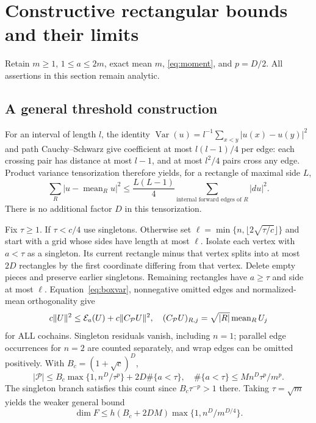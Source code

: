 \section{Constructive rectangular bounds and their limits}\label{sec:spatial-new}
Retain $m\geq1$, $1\leq a\leq2m$, exact mean $m$, \eqref{eq:moment},
and $p=D/2$. All assertions in this section remain analytic.

\subsection{A general threshold construction}
For an interval of length $l$, the identity
$\operatorname{Var}(u)=l^{-1}\sum_{x<y}|u(x)-u(y)|^2$ and path
Cauchy--Schwarz give coefficient at most $l(l-1)/4$ per edge: each
crossing pair has distance at most $l-1$, and at most $l^2/4$ pairs cross
any edge. Product variance tensorization therefore yields, for a rectangle
of maximal side $L$,
\begin{equation}\label{eq:boxvar}
 \sum_R|u-\operatorname{mean}_R u|^2
 \leq \frac{L(L-1)}4\sum_{\text{internal forward edges of }R}|du|^2.
\end{equation}
There is no additional factor $D$ in this tensorization.

Fix $\tau\geq1$. If $\tau<c/4$ use singletons. Otherwise set
$\ell=\min\{n,\lfloor2\sqrt{\tau/c}\rfloor\}$ and start with a grid
whose sides have length at most $\ell$. Isolate each vertex with $a<\tau$
as a singleton. Its current rectangle minus that vertex splits into at most
$2D$ rectangles by the first coordinate differing from that vertex. Delete
empty pieces and preserve earlier singletons. Remaining rectangles have
$a\geq\tau$ and side at most $\ell$. Equation~\eqref{eq:boxvar},
nonnegative omitted edges and normalized-mean orthogonality give
\begin{equation}\label{eq:globalmeans}
 c\|U\|^2\leq\mathcal E_a(U)+c\|C_{\mathcal P}U\|^2,
 \quad (C_{\mathcal P}U)_{R,j}=\sqrt{|R|}\operatorname{mean}_R U_j
\end{equation}
for ALL cochains. Singleton residuals vanish, including $n=1$; parallel
edge occurrences for $n=2$ are counted separately, and wrap edges can be
omitted positively. With $B_c=(1+\sqrt c)^D$,
\[
 |\mathcal P|\leq B_c\max\{1,n^D/\tau^p\}+2D\#\{a<\tau\},\quad
 \#\{a<\tau\}\leq M n^D\tau^p/m^p.
\]
The singleton branch satisfies this count since $B_c\tau^{-p}>1$ there.
Taking $\tau=\sqrt m$ yields the weaker general bound
\[
 \dim F\leq h(B_c+2DM)\max\{1,n^D/m^{D/4}\}.
\]

